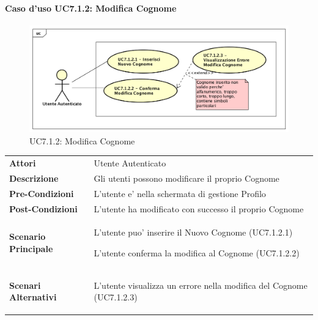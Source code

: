 \paragraph{Caso d'uso UC7.1.2:  Modifica Cognome}
\label{UC7_1_2}
\begin{figure}[ht]
	\centering
	\includegraphics[scale=0.45]{UML/UC7_1_2.png}
	\caption{UC7.1.2:  Modifica Cognome}
\end{figure}

\FloatBarrier
\begin{tabular}{ l | p{11cm}}
	\hline
	\rowcolor{Gray}
	 \multicolumn{2}{c}{UC7.1.2 - Modifica Cognome} \\
	 \hline
	\textbf{Attori} & Utente Autenticato \\
	\textbf{Descrizione} & Gli utenti possono modificare il proprio Cognome\\
	\textbf{Pre-Condizioni} & L'utente e' nella schermata di gestione Profilo\\
	\textbf{Post-Condizioni} & L'utente ha modificato con successo il proprio Cognome \\
	\textbf{Scenario Principale} & 
	\begin{enumerate*}[label=(\arabic*.),itemjoin={\newline}]
		\item L'utente puo' inserire il Nuovo Cognome (UC7.1.2.1)
		\item L'utente conferma la modifica al Cognome (UC7.1.2.2)
	\end{enumerate*}\\
	\textbf{Scenari Alternativi} & 
	\begin{enumerate*}[label=(\arabic*.),itemjoin={\newline}]
		\item L'utente visualizza un errore nella modifica del Cognome (UC7.1.2.3)
	\end{enumerate*}\\
\end{tabular}
